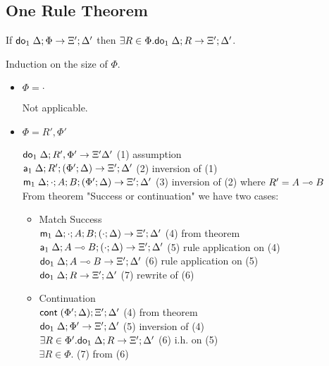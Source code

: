 \documentclass[9pt]{article}
\begin{document}
\subsection{One Rule Theorem}

If $\mathsf{do}_1 \; \Delta; \Phi \rightarrow \Xi'; \Delta'$ then $\exists R \in \Phi. \mathsf{do}_1 \; \Delta; R \rightarrow \Xi'; \Delta'$.

Induction on the size of $\Phi$.

\begin{itemize}
\item $\Phi = \cdot$

Not applicable.

\item $\Phi = R', \Phi'$

$\mathsf{do}_1 \; \Delta; R', \Phi' \rightarrow \Xi' \Delta'$ \hfill (1) assumption \\
$\mathsf{a}_1 \; \Delta; R'; (\Phi'; \Delta) \rightarrow \Xi'; \Delta'$ \hfill (2) inversion of (1) \\
$\mathsf{m}_1 \; \Delta; \cdot; A; B; (\Phi'; \Delta) \rightarrow \Xi'; \Delta'$ \hfill (3) inversion of (2) where $R' = A \multimap B$\\

From theorem "Success or continuation" we have two cases:

   \begin{itemize}
   \item Match Success \\
   $\mathsf{m}_1 \; \Delta; \cdot; A; B; (\cdot; \Delta) \rightarrow \Xi'; \Delta'$ \hfill (4) from theorem \\
   $\mathsf{a}_1 \; \Delta; A \multimap B; (\cdot; \Delta) \rightarrow \Xi'; \Delta'$ \hfill (5) rule application on (4) \\
   $\mathsf{do}_1 \; \Delta; A \multimap B \rightarrow \Xi'; \Delta'$ \hfill (6) rule application on (5) \\
   $\mathsf{do}_1 \; \Delta; R \rightarrow \Xi'; \Delta'$ \hfill (7) rewrite of (6) \\

   \item Continuation \\
   $\mathsf{cont} \; (\Phi'; \Delta); \Xi'; \Delta'$ \hfill (4) from theorem \\
   $\mathsf{do}_1 \; \Delta; \Phi' \rightarrow \Xi'; \Delta'$ \hfill (5) inversion of (4) \\
   $\exists R \in \Phi'. \mathsf{do}_1 \; \Delta; R \rightarrow \Xi'; \Delta'$ \hfill (6) i.h. on (5) \\
   $\exists R \in \Phi.$ \hfill (7) from (6) \\
   \end{itemize}

\end{itemize}
\end{document}
